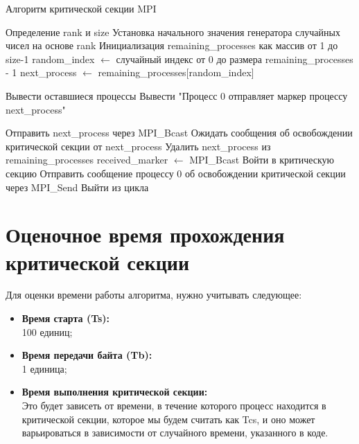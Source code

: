 \documentclass[openany, twoside, a4paper, 12pt]{extbook}
\begin{document}
	\begin{algorithm}
		\caption{Алгоритм критической секции MPI}
		\label{alg:all}
		\begin{algorithmic}[1]
			\STATE Определение rank и size
			\STATE Установка начального значения генератора случайных чисел на основе rank
			    \STATE Инициализация remaining\_processes как массив от 1 до size-1
			        \STATE random\_index $\gets$ случайный индекс от 0 до размера remaining\_processes - 1
			        \STATE next\_process $\gets$ remaining\_processes[random\_index]
			        
			        \STATE Вывести оставшиеся процессы
			        \STATE Вывести "Процесс 0 отправляет маркер процессу next\_process"
			        
			        \STATE Отправить next\_process через MPI\_Bcast
			        \STATE Ожидать сообщения об освобождении критической секции от next\_process
			        \STATE Удалить next\_process из remaining\_processes
			    \ENDWHILE
			\ELSE
			        \STATE received\_marker $\gets$ MPI\_Bcast
			            \STATE Войти в критическую секцию
			            \STATE Отправить сообщение процессу 0 об освобождении критической секции через MPI\_Send
			            \STATE Выйти из цикла
			        \ENDIF
			    \ENDWHILE
			\ENDIF		
		\end{algorithmic}
	\end{algorithm}
	
	\section*{Оценочное время прохождения критической секции}
		Для оценки времени работы алгоритма, нужно учитывать следующее:
		\begin{itemize}
			\item{\textbf{Время старта (Ts):}}\\ 100 единиц;
			\item{\textbf{Время передачи байта (Tb):}}\\ 1 единица;
			\item{\textbf{Время выполнения критической секции:}}\\
			Это будет зависеть от времени, в течение которого процесс находится в критической секции,
			которое мы будем считать как Tcs,
			и оно может варьироваться в зависимости от случайного времени,
			указанного в коде.
		\end{itemize}
\end{document}
